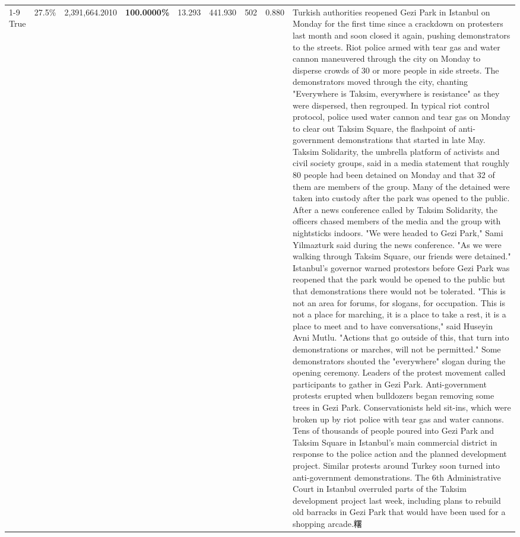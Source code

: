\begin{table}[H]
\begin{tabular}{lllrlllll}
\cline{1-9}
True & 27.5\% & 2,391,664.2010 & \bfseries \color{red} 100.0000\% & 13.293 & 441.930 & 502 & 0.880 & Turkish authorities reopened Gezi Park in Istanbul on Monday for the first time since a crackdown on protesters last month and soon closed it again, pushing demonstrators to the streets. Riot police armed with tear gas and water cannon maneuvered through the city on Monday to disperse crowds of 30 or more people in side streets. The demonstrators moved through the city, chanting "Everywhere is Taksim, everywhere is resistance" as they were dispersed, then regrouped. In typical riot control protocol, police used water cannon and tear gas on Monday to clear out Taksim Square, the flashpoint of anti-government demonstrations that started in late May. Taksim Solidarity, the umbrella platform of activists and civil society groups, said in a media statement that roughly 80 people had been detained on Monday and that 32 of them are members of the group. Many of the detained were taken into custody after the park was opened to the public. After a news conference called by Taksim Solidarity, the officers chased members of the media and the group with nightsticks indoors. "We were headed to Gezi Park," Sami Yilmazturk said during the news conference. "As we were walking through Taksim Square, our friends were detained." Istanbul's governor warned protestors before Gezi Park was reopened that the park would be opened to the public but that demonstrations there would not be tolerated. "This is not an area for forums, for slogans, for occupation. This is not a place for marching, it is a place to take a rest, it is a place to meet and to have conversations," said Huseyin Avni Mutlu. "Actions that go outside of this, that turn into demonstrations or marches, will not be permitted." Some demonstrators shouted the "everywhere" slogan during the opening ceremony. Leaders of the protest movement called participants to gather in Gezi Park. Anti-government protests erupted when bulldozers began removing some trees in Gezi Park. Conservationists held sit-ins, which were broken up by riot police with tear gas and water cannons. Tens of thousands of people poured into Gezi Park and Taksim Square in Istanbul's main commercial district in response to the police action and the planned development project. Similar protests around Turkey soon turned into anti-government demonstrations. The 6th Administrative Court in Istanbul overruled parts of the Taksim development project last week, including plans to rebuild old barracks in Gezi Park that would have been used for a shopping arcade.糬 \\

\end{tabular}
\end{table}
